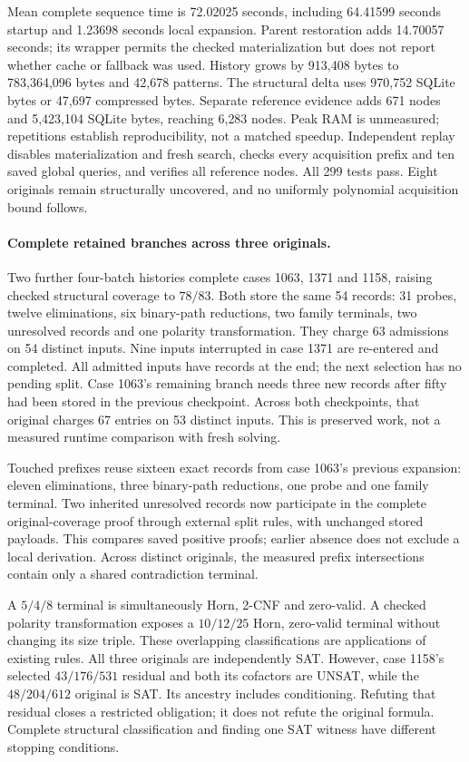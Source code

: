 \documentclass[11pt,a4paper]{article}
\numberwithin{equation}{section}
\theoremstyle{plain}
\theoremstyle{definition}
\theoremstyle{remark}
\begin{document}
Mean complete sequence time is 72.02025 seconds, including
64.41599 seconds startup and 1.23698 seconds local expansion.
Parent restoration adds 14.70057 seconds; its wrapper permits the checked
materialization but does not report whether cache or fallback was used.
History grows by 913,408 bytes to 783,364,096 bytes and 42,678 patterns.
The structural delta uses 970,752 SQLite bytes or 47,697 compressed bytes.
Separate reference evidence adds 671 nodes and 5,423,104 SQLite bytes, reaching
6,283 nodes. Peak RAM is unmeasured; repetitions establish reproducibility, not
a matched speedup. Independent replay disables materialization and fresh search,
checks every acquisition prefix and ten saved global queries, and verifies all
reference nodes. All 299 tests pass. Eight originals remain structurally
uncovered, and no uniformly polynomial acquisition bound follows.

\paragraph{Complete retained branches across three originals.}
Two further four-batch histories complete cases 1063, 1371 and 1158, raising
checked structural coverage to $78/83$. Both store the same 54 records: 31 probes,
twelve eliminations, six binary-path reductions, two family terminals, two unresolved
records and one polarity transformation. They charge 63 admissions on 54 distinct
inputs. Nine inputs interrupted in case 1371 are re-entered and completed. All
admitted inputs have records at the end; the next selection has no pending split.
Case 1063's remaining branch needs three new records after fifty had been stored
in the previous checkpoint. Across both checkpoints, that original charges
67 entries on 53 distinct inputs. This is preserved work, not a measured runtime
comparison with fresh solving.

Touched prefixes reuse sixteen exact records from case 1063's previous expansion:
eleven eliminations, three binary-path reductions, one probe and one family terminal.
Two inherited unresolved records now participate in the complete original-coverage
proof through external split rules, with unchanged stored payloads. This compares
saved positive proofs; earlier absence does not exclude a local derivation.
Across distinct originals, the measured prefix intersections contain only a
shared contradiction terminal.

A $5/4/8$ terminal is simultaneously Horn, 2-CNF and zero-valid. A checked polarity
transformation exposes a $10/12/25$ Horn, zero-valid terminal without changing its
size triple. These overlapping classifications are applications of existing rules.
All three originals are independently SAT. However, case 1158's selected
$43/176/531$ residual and both its cofactors are UNSAT, while the $48/204/612$
original is SAT. Its ancestry includes conditioning. Refuting that residual closes
a restricted obligation; it does not refute the original formula. Complete
structural classification and finding one SAT witness have different stopping
conditions.
\end{document}
